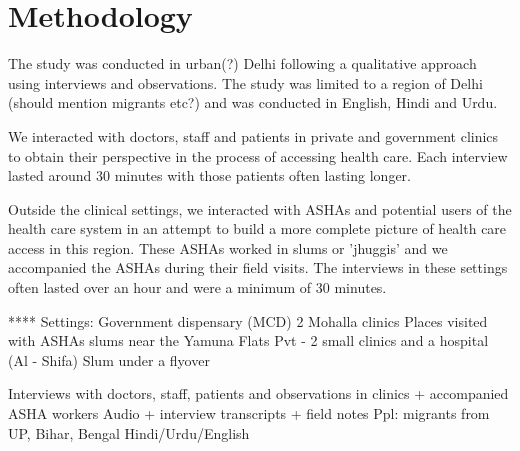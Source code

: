 \section{Methodology}

\begin{comment}
This should tell the story of what you did, and the single most important point is to show that you were reflective, rigorous, ethical, sound in your research. 
Start with where you conducted the study. Was there one site or many? How long was your (the authors’) engagement with this site? What was the nature of the engagement? And remember to anonymize by default.
Say what methods you used and who you studied. How long were your interviews? What kinds of questions did you ask? Did you use an interpreter? Who were these people? How old?
Add a paragraph on who the authors are and what they bring to the table. Say what their biases might have been that could be limitations of this work. Was there access you could not get? 
How did you analyze the data? If you used grounded theory, whose version of grounded theory did you use? Who was responsible for the analysis? 
Finally, there are lots of papers that have a decent write-up for methodology. Find a researcher you like and read up on the Methodology section.
\end{comment}

\textcolor{red}{}
The study was conducted in urban(?) Delhi following a qualitative approach using interviews and observations. The study was limited to a region of Delhi (should mention migrants etc?) and was conducted in English, Hindi and Urdu.

We interacted with doctors, staff and patients in private and government clinics to obtain their perspective in the process of accessing health care. Each interview lasted around 30 minutes with those patients often lasting longer. 

Outside the clinical settings, we interacted with ASHAs and potential users of the health care system in an attempt to build a more complete picture of health care access in this region. These ASHAs worked in slums or 'jhuggis' and we accompanied the ASHAs during their field visits. The interviews in these settings often lasted over an hour and were a minimum of 30 minutes.

****
Settings:
Government dispensary (MCD)
2 Mohalla clinics
Places visited with ASHAs
slums near the Yamuna
Flats
Pvt - 2 small clinics and a hospital (Al - Shifa)
Slum under a flyover

Interviews with doctors, staff, patients and observations in clinics + accompanied ASHA workers
Audio + interview transcripts + field notes
Ppl: migrants from UP, Bihar, Bengal
Hindi/Urdu/English